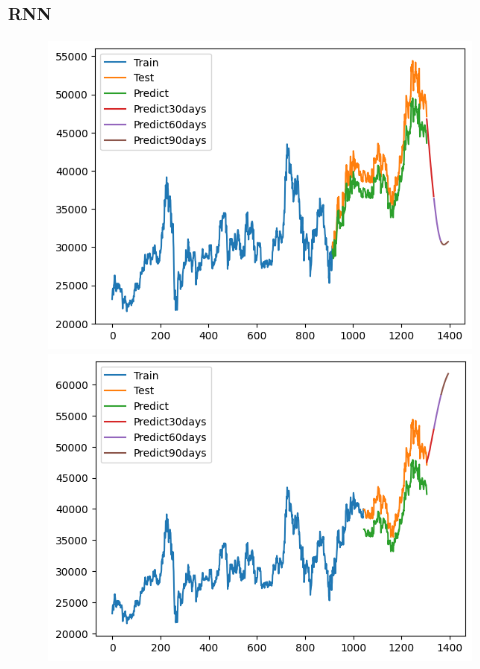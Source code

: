 \subsubsection{RNN}
\begin{figure}[H]
    \centering
    \begin{minipage}{0.15\textwidth}
    \centering
    \includegraphics[width=1\textwidth]{resources/chapter-5/newdata1/result/BIDV_ RNN_7-3.png}
    \end{minipage}
    \hfill
    \begin{minipage}{0.15\textwidth}
    \centering
    \includegraphics[width=1\textwidth]{resources/chapter-5/newdata1/result/BIDV_ RNN_8-2.png}
    \end{minipage}
    \hfill
        \begin{minipage}{0.15\textwidth}

\end{minipage}
\end{figure}
